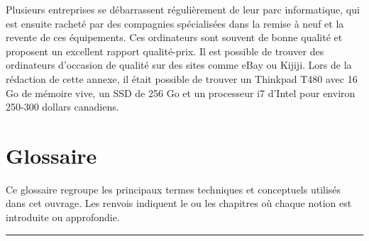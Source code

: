 \documentclass[
  letterpaper,
  DIV=11,
  numbers=noendperiod,
  oneside]{scrreprt}
\begin{document}
Plusieurs entreprises se débarrassent régulièrement de leur parc
informatique, qui est ensuite racheté par des compagnies spécialisées
dans la remise à neuf et la revente de ces équipements. Ces ordinateurs
sont souvent de bonne qualité et proposent un excellent rapport
qualité-prix. Il est possible de trouver des ordinateurs d'occasion de
qualité sur des sites comme eBay ou Kijiji. Lors de la rédaction de
cette annexe, il était possible de trouver un Thinkpad T480 avec 16 Go
de mémoire vive, un SSD de 256 Go et un processeur i7 d'Intel pour
environ 250-300 dollars canadiens.

\hypertarget{sec-glossaire}{%
\chapter{Glossaire}\label{sec-glossaire}}

Ce glossaire regroupe les principaux termes techniques et conceptuels
utilisés dans cet ouvrage. Les renvois indiquent le ou les chapitres où
chaque notion est introduite ou approfondie.

\begin{center}\rule{0.5\linewidth}{0.5pt}\end{center}
\end{document}
